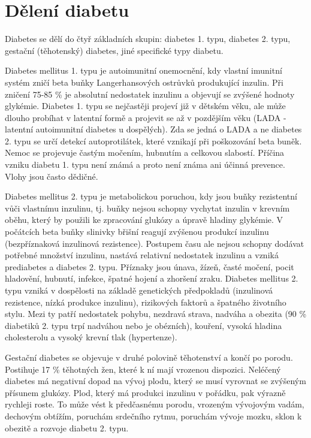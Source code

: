\section{Dělení diabetu}

Diabetes se dělí do čtyř základních skupin: diabetes 1. typu, diabetes 2. typu, gestační (těhotenský) diabetes, jiné specifické typy diabetu.

Diabetes mellitus 1. typu je autoimunitní onemocnění, kdy vlastní imunitní systém zničí beta buňky Langerhansových ostrůvků produkující inzulin. Při zničení 75-85 \% je absolutní nedostatek inzulinu a objevují se zvýšené hodnoty glykémie. Diabetes 1. typu se nejčastěji projeví již v dětském věku, ale může dlouho probíhat v latentní formě a projevit se až v pozdějším věku (LADA - latentní autoimunitní diabetes u dospělých). Zda se jedná o LADA a ne diabetes 2. typu se určí detekcí autoprotilátek, které vznikají při poškozování beta buněk. Nemoc se projevuje častým močením, hubnutím a celkovou slabostí. Příčina vzniku diabetu 1. typu není známá a proto není známa ani účinná prevence. Vlohy jsou často dědičné.

Diabetes mellitus 2. typu je metabolickou poruchou, kdy jsou buňky rezistentní vůči vlastnímu inzulinu, tj. buňky nejsou schopny vychytat inzulin v krevním oběhu, který by použili ke zpracování glukózy a úpravě hladiny glykémie. V počátcích beta buňky slinivky břišní reagují zvýšenou produkcí inzulinu (bezpříznaková inzulinová rezistence). Postupem času ale nejsou schopny dodávat potřebné množství inzulinu, nastává relativní nedostatek inzulinu a vzniká prediabetes a diabetes 2. typu. Příznaky jsou únava, žízeň, časté močení, pocit hladovění, hubnutí, infekce, špatné hojení a zhoršení zraku. Diabetes mellitus 2. typu vzniká v dospělosti na základě genetických předpokladů (inzulinová rezistence, nízká produkce inzulinu), rizikových faktorů a špatného životního stylu. Mezi ty patří nedostatek pohybu, nezdravá strava, nadváha a obezita (90 \% diabetiků 2. typu trpí nadváhou nebo je obézních), kouření, vysoká hladina cholesterolu a vysoký krevní tlak (hypertenze).

Gestační diabetes se objevuje v druhé polovině těhotenství a končí po porodu. Postihuje 17 \% těhotných žen, které k ní mají vrozenou dispozici. Neléčený diabetes má negativní dopad na vývoj plodu, který se musí vyrovnat se zvýšeným přísunem glukózy. Plod, který má produkci inzulinu v pořádku, pak výrazně rychleji roste. To může vést k předčasnému porodu, vrozeným vývojovým vadám, dechovým obtížím, poruchám srdečního rytmu, poruchám vývoje mozku, sklon k obezitě a rozvoje diabetu 2. typu.

